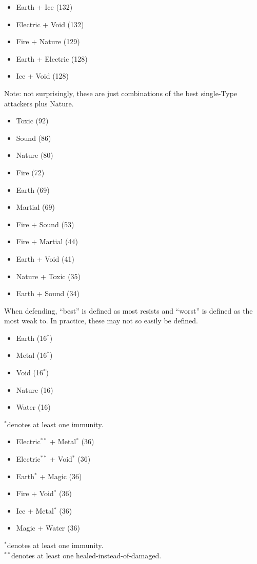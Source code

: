 
\begin{itemize}
	\item{Earth + Ice (132)}
	\item{Electric + Void (132)}
	\item{Fire + Nature (129)}
	\item{Earth + Electric (128)}
	\item{Ice + Void (128)}
\end{itemize}

\noindent Note: not surprisingly, these are just combinations of the best single-Type attackers plus Nature.


\begin{itemize}
	\item{Toxic (92)}
	\item{Sound (86)}
	\item{Nature (80)}
	\item{Fire (72)}
	\item{Earth (69)}
	\item{Martial (69)}
\end{itemize}

\begin{itemize}
	\item{Fire + Sound (53)}
	\item{Fire + Martial (44)}
	\item{Earth + Void (41)}
	\item{Nature + Toxic (35)}
	\item{Earth + Sound (34)}
\end{itemize}

When defending, ``best'' is defined as most resists and ``worst'' is defined as the most weak to. In practice, these may not so easily be defined.

\begin{itemize}
	\item{Earth (16$^*$)}
	\item{Metal (16$^*$)}
	\item{Void (16$^*$)}
	\item{Nature (16)}
	\item{Water (16)}
\end{itemize}
$^*$denotes at least one immunity.

\begin{itemize}
	\item{Electric$^{**}$ + Metal$^*$ (36)}
	\item{Electric$^{**}$ + Void$^*$ (36)}
	\item{Earth$^*$ + Magic (36)}
	\item{Fire + Void$^*$ (36)}
	\item{Ice + Metal$^*$ (36)}
	\item{Magic + Water (36)}
\end{itemize}
$^*$denotes at least one immunity.\\
$^{**}$denotes at least one healed-instead-of-damaged.

